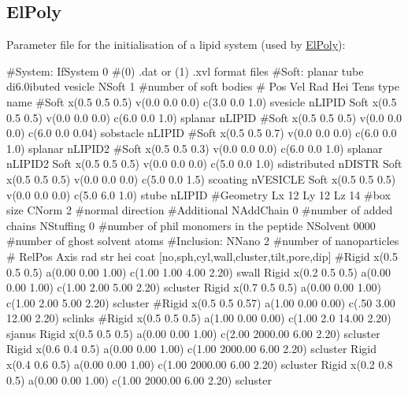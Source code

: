 \hypertarget{usage_page_ElPoly_section}{}\subsection{\-El\-Poly}\label{usage_page_ElPoly_section}
\-Parameter file for the initialisation of a lipid system (used by \hyperlink{classElPoly}{\-El\-Poly})\-: 
\begin{DoxyCode}
#System:
IfSystem 0          #(0) .dat or (1) .xvl format files
#Soft: planar tube di6.0ibuted vesicle
NSoft 1             #number of soft bodies
#    Pos            Vel            Rad Hei Tens   type      name
#Soft x(0.5 0.5 0.5) v(0.0 0.0 0.0) c(3.0 0.0 1.0) s{vesicle} n{LIPID}
Soft x(0.5 0.5 0.5) v(0.0 0.0 0.0) c(6.0 0.0 1.0) s{planar} n{LIPID}
#Soft x(0.5 0.5 0.5) v(0.0 0.0 0.0) c(6.0 0.0 0.04) s{obstacle} n{LIPID}
#Soft x(0.5 0.5 0.7) v(0.0 0.0 0.0) c(6.0 0.0 1.0) s{planar} n{LIPID2}
#Soft x(0.5 0.5 0.3) v(0.0 0.0 0.0) c(6.0 0.0 1.0) s{planar} n{LIPID2}
Soft x(0.5 0.5 0.5) v(0.0 0.0 0.0) c(5.0 0.0 1.0) s{distributed} n{DISTR}
Soft x(0.5 0.5 0.5) v(0.0 0.0 0.0) c(5.0 0.0 1.5) s{coating} n{VESICLE}
Soft x(0.5 0.5 0.5) v(0.0 0.0 0.0) c(5.0 6.0 1.0) s{tube} n{LIPID}
#Geometry
Lx 12 Ly 12 Lz 14   #box size
CNorm  2            #normal direction
#Additional
NAddChain 0       #number of added chains
NStuffing 0         #number of phil monomers in the peptide
NSolvent  0000      #number of ghost solvent atoms
#Inclusion:
NNano 2            #number of nanoparticles
#     RelPos         Axis                rad  str  hei  coat
       [no,sph,cyl,wall,cluster,tilt,pore,dip]
#Rigid x(0.5 0.5 0.5) a(0.00 0.00 1.00) c(1.00 1.00 4.00 2.20) s{wall}
Rigid x(0.2 0.5 0.5) a(0.00 0.00 1.00) c(1.00 2.00 5.00 2.20) s{cluster}
Rigid x(0.7 0.5 0.5) a(0.00 0.00 1.00) c(1.00 2.00 5.00 2.20) s{cluster}
#Rigid x(0.5 0.5 0.57) a(1.00 0.00 0.00) c(.50 3.00 12.00 2.20) s{clinks}
#Rigid x(0.5 0.5 0.5) a(1.00 0.00 0.00) c(1.00 2.0 14.00 2.20) s{janus}
Rigid x(0.5 0.5 0.5) a(0.00 0.00 1.00) c(2.00 2000.00 6.00 2.20) s{cluster}
Rigid x(0.6 0.4 0.5) a(0.00 0.00 1.00) c(1.00 2000.00 6.00 2.20) s{cluster}
Rigid x(0.4 0.6 0.5) a(0.00 0.00 1.00) c(1.00 2000.00 6.00 2.20) s{cluster}
Rigid x(0.2 0.8 0.5) a(0.00 0.00 1.00) c(1.00 2000.00 6.00 2.20) s{cluster}


\end{DoxyCode}
